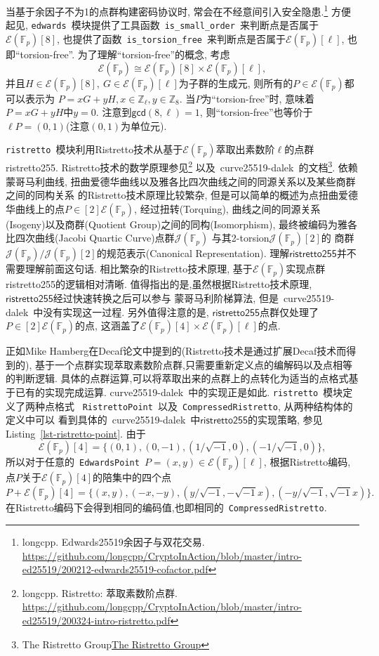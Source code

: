 \documentclass{article}
\newcommand{\Z}{\mathbb{Z}}
\newcommand{\F}{\mathbb{F}}
\newcommand{\code}[1]{\lstinline!#1!}
\begin{document}
当基于余因子不为1的点群构建密码协议时, 常会在不经意间引入安全隐患.\footnote{
longcpp. Edwards25519余因子与双花交易.
\url{https://github.com/longcpp/CryptoInAction/blob/master/intro-ed25519/200212-edwards25519-cofactor.pdf}}
方便起见, \code{edwards}~模块提供了工具函数~\code{is_small_order}~来判断点是否属于$\mathcal{E}(\F_p) [8]$,
也提供了函数~\code{is_torsion_free}~来判断点是否属于$ \mathcal{E}(\F_p)[\ell]$, 也即``torsion-free''.
为了理解``torsion-free''的概念, 考虑
$$\mathcal{E}(\F_p) \cong \mathcal{E}(\F_p) [8] \times \mathcal{E}(\F_p)[\ell],$$
并且$H \in  \mathcal{E}(\F_p) [8],\ G\in \mathcal{E}(\F_p)[\ell]$为子群的生成元,
则所有的$P \in \mathcal{E}(\F_p)$都可以表示为 $P = xG + yH, x\in \Z_\ell, y\in\Z_8$.
当$P$为``torsion-free''时, 意味着$P= xG+ yH$中$y = 0$. 
注意到$\textsf{gcd}(8,\ell) = 1$, 则``torsion-free''也等价于$\ell P = (0,1)$(注意$(0,1)$为单位元).

\code{ristretto}~模块利用Ristretto技术从基于$\mathcal{E}(\F_p)$萃取出素数阶$\ell$的点群\textsf{ristretto255}.
Ristretto技术的数学原理参见\footnote{longcpp. Ristretto: 萃取素数阶点群.
\url{https://github.com/longcpp/CryptoInAction/blob/master/intro-ed25519/200324-intro-ristretto.pdf}}
以及~\textsf{curve25519-dalek}~的文档\footnote{
The Ristretto Group\url{The Ristretto Group}}.
依赖蒙哥马利曲线, 扭曲爱德华曲线以及雅各比四次曲线之间的同源关系以及某些商群之间的同构关系
的Ristretto技术原理比较繁杂, 但是可以简单的概述为点扭曲爱德华曲线上的点$P\in [2]\mathcal{E}(\F_p)$,
经过扭转(Torquing), 曲线之间的同源关系(Isogeny)以及商群(Quotient Group)之间的同构(Isomorphism),
最终被编码为雅各比四次曲线(Jacobi Quartic Curve)点群$\mathcal{J}(\F_p)$
与其2-torsion$\mathcal{J}(\F_p)[2]$的
商群$\mathcal{J}(\F_p)/\mathcal{J}(\F_p)[2]$的规范表示(Canonical Representation).
理解$\textsf{ristretto255}$并不需要理解前面这句话.
相比繁杂的Ristretto技术原理, 基于$\mathcal{E}(\F_p)$实现点群\textsf{ristretto255}的逻辑相对清晰.
值得指出的是,虽然根据Ristretto技术原理, $\textsf{ristretto255}$经过快速转换之后可以参与
蒙哥马利阶梯算法, 但是~\textsf{curve25519-dalek}~中没有实现这一过程.
另外值得注意的是, $\textsf{ristretto255}$点群仅处理了$P\in [2]\mathcal{E}(\F_p)$的点,
这涵盖了$\mathcal{E}(\F_p)[4]\times\mathcal{E}(\F_p)[\ell]$的点.

正如Mike Hamberg在Decaf论文中提到的(Ristretto技术是通过扩展Decaf技术而得到的),
基于一个点群实现萃取素数阶点群,只需要重新定义点的编解码以及点相等的判断逻辑.
具体的点群运算,可以将萃取出来的点群上的点转化为适当的点格式基于已有的实现完成运算.
\textsf{curve25519-dalek}~中的实现正是如此. \code{ristretto}~模块定义了两种点格式
~\code{RistrettoPoint}~以及~\code{CompressedRistretto}, 从两种结构体的定义中可以
看到具体的~\textsf{curve25519-dalek}~中$\textsf{ristretto255}$的实现策略,
参见Listing~\ref{lst-ristretto-point}. 由于
$$
\mathcal{E}(\F_p)[4] = \{ (0,1), (0,-1), (1/\sqrt{-1}, 0), (-1/\sqrt{-1}, 0) \},
$$
所以对于任意的~\code{EdwardsPoint}~$P=(x,y)\in\mathcal{E}(\F_p)[\ell]$, 
根据Ristretto编码, 点$P$关于$\mathcal{E}(\F_p)[4]$的陪集中的四个点
$$
P + \mathcal{E}(\F_p)[4] = \{ (x,y), (-x,-y), (y/\sqrt{-1}, -\sqrt{-1}x), (-y/\sqrt{-1}, \sqrt{-1}x) \}.
$$
在Ristretto编码下会得到相同的编码值,也即相同的~\code{CompressedRistretto}.
\end{document}
